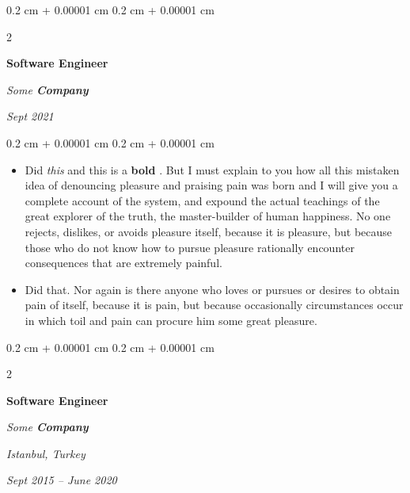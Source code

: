 \documentclass[10pt, letterpaper]{article}
\newenvironment{highlights}{
    \begin{itemize}[
        topsep=0.10 cm,
        parsep=0.10 cm,
        partopsep=0pt,
        itemsep=0pt,
        leftmargin=0.4 cm + 10pt
    ]
}{
    \end{itemize}
} %
\newenvironment{onecolentry}{
    \begin{adjustwidth}{
        0.2 cm + 0.00001 cm
    }{
        0.2 cm + 0.00001 cm
    }
}{
    \end{adjustwidth}
} %
\newenvironment{twocolentry}[2][]{
    \onecolentry
    \def\secondColumn{#2}
    \setcolumnwidth{\fill, 4.5 cm}
    \begin{paracol}{2}
}{
    \switchcolumn \raggedleft \secondColumn
    \end{paracol}
    \endonecolentry
} %
\let\hrefWithoutArrow\href
\renewcommand{\href}[2]{\hrefWithoutArrow{#1}{\ifthenelse{\equal{#2}{}}{ }{#2 }\raisebox{.15ex}{\footnotesize \faExternalLink*}}}
\begin{document}
        \vspace{0.2 cm}

            \begin{twocolentry}{


        \textit{Sept 2021}    }
                \textbf{Software Engineer}

                \textit{Some \textbf{Company}}
            \end{twocolentry}

        \vspace{0.10 cm}
        \begin{onecolentry}
            \begin{highlights}
                \item Did \textit{this} and this is a \textbf{bold} \href{https://example.com}{link}. But I must explain to you how all this mistaken idea of denouncing pleasure and praising pain was born and I will give you a complete account of the system, and expound the actual teachings of the great explorer of the truth, the master-builder of human happiness. No one rejects, dislikes, or avoids pleasure itself, because it is pleasure, but because those who do not know how to pursue pleasure rationally encounter consequences that are extremely painful.
                \item Did that. Nor again is there anyone who loves or pursues or desires to obtain pain of itself, because it is pain, but because occasionally circumstances occur in which toil and pain can procure him some great pleasure.
            \end{highlights}
        \end{onecolentry}


        \vspace{0.2 cm}

            \begin{twocolentry}{
        \textit{Istanbul, Turkey}

        \textit{Sept 2015 – June 2020}    }
                \textbf{Software Engineer}

                \textit{Some \textbf{Company}}
            \end{twocolentry}
\end{document}
